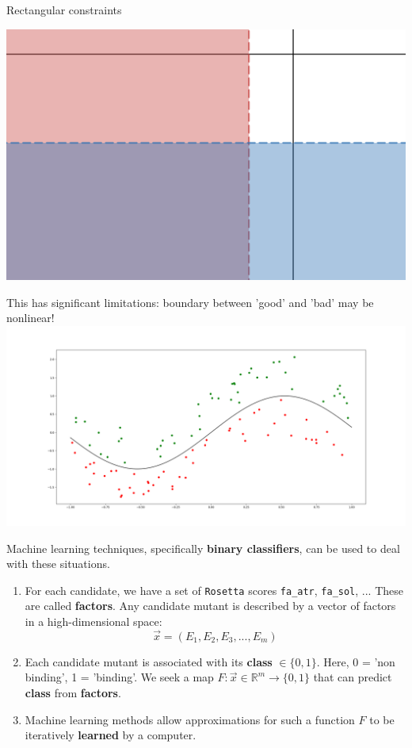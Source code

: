 \documentclass{beamer}
\begin{document}
\begin{frame}
    Rectangular constraints
    \begin{center}
    \includegraphics[width=0.8\linewidth]{rectangularconstraints.png}
    \end{center}
\end{frame}

\begin{frame}
    This has significant limitations: boundary between 'good' and 'bad' may be nonlinear! \\
    \includegraphics[width=\linewidth]{diagram2.png}
\end{frame}

\begin{frame}
    Machine learning techniques, specifically \textbf{binary classifiers}, can be used to deal with these situations.
\begin{enumerate}
\item For each candidate, we have a set of \texttt{Rosetta} scores \texttt{fa\_atr}, \texttt{fa\_sol}, ...
    These are called \textbf{factors}. Any candidate mutant is described by a vector of factors in a high-dimensional space:
    $$\vec{x} = (E_1, E_2, E_3, ..., E_m)$$
    
    \item Each candidate mutant is associated with its \textbf{class} $\in \{0, 1\}$. Here, 0 = 'non binding', 1 = 'binding'. We seek a map $F : \vec{x} \in \mathbb{R}^m \to \{0, 1\}$ that can predict \textbf{class} from \textbf{factors}.
    
    \item Machine learning methods allow approximations for such a function $F$ to be iteratively \textbf{learned} by a computer.
\end{enumerate}
\end{frame}
\end{document}
